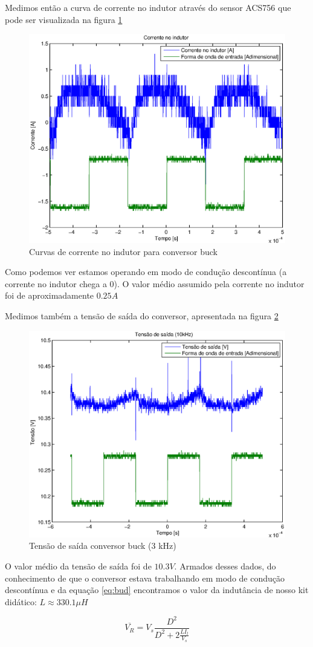 \documentclass{article}
\begin{document}
Medimos então a curva de corrente no indutor através do sensor ACS756 que pode ser visualizada na figura \ref{fig:buil}
\begin{figure}[H]
	\centering
	\includegraphics[width=0.5\linewidth]{Dados/buck/il}
	\caption{Curvas de corrente no indutor para conversor buck}
	\label{fig:buil}
\end{figure}
Como podemos ver estamos operando em modo de condução descontínua (a corrente no indutor chega a 0). O valor médio assumido pela corrente no indutor foi de aproximadamente $0.25 A$

Medimos também a tensão de saída do conversor, apresentada na figura \ref{fig:but3k}
\begin{figure}[H]
	\centering
	\includegraphics[width=0.5\linewidth]{Dados/buck/t3k}
	\caption{Tensão de saída conversor buck (3 kHz)}
	\label{fig:but3k}
\end{figure}

O valor médio da tensão de saída foi de $10.3 V$. Armados desses dados, do conhecimento de que o conversor estava trabalhando em modo de condução descontínua e da equação \ref{eq:bud} encontramos o valor da indutância de nosso kit didático: $L \approx 330.1 \mu H$

\begin{capequ}
	\begin{equation}
	\overline{V_R} = V_s\frac{D^2}{D^2 + 2\frac{LI_l}{V_s}}
	\end{equation}
	\caption{Equação da tensão de saída para conversor buck em modo de condução descontínua}
	\label{eq:bud}
\end{capequ}
\end{document}
